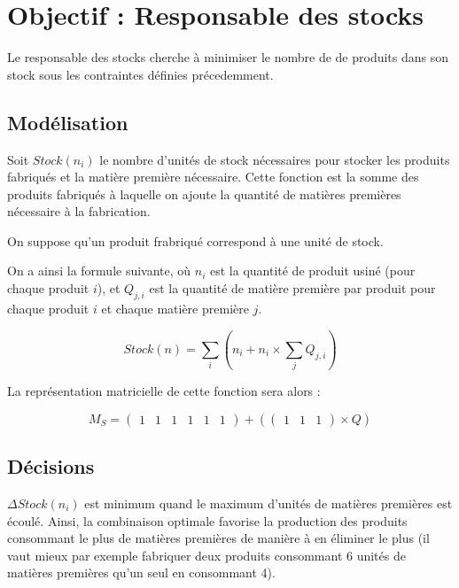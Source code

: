 \newpage
\section{Objectif : Responsable des stocks}
Le responsable des stocks cherche à minimiser le nombre de de produits dans
son stock sous les contraintes définies précedemment.

\subsection{Modélisation}
Soit $Stock(n_{i})$ le nombre d'unités de stock nécessaires pour stocker les
produits fabriqués et la matière première nécessaire. Cette fonction est la
somme des produits fabriqués à laquelle on ajoute la quantité de matières
premières nécessaire à la fabrication.

On suppose qu'un produit frabriqué correspond à une unité de stock.

On a ainsi la formule suivante, où $n_{i}$ est la quantité de produit usiné
(pour chaque produit $i$), et $Q_{j,i}$ est la quantité de matière première
par produit pour chaque produit $i$ et chaque matière première $j$.

\begin{equation}
	Stock(n) = \sum_{i} (n_{i} + n_{i} \times \sum_{j} Q_{j,i})
\end{equation}

La représentation matricielle de cette fonction sera alors :

\begin{equation}
	M_S = \begin{pmatrix}
		1 & 1 & 1 & 1 & 1 & 1
	\end{pmatrix} + (
	\begin{pmatrix}
		1 & 1 & 1
	\end{pmatrix}
	\times Q)
\end{equation}

\subsection{Décisions}
$\Delta Stock(n_{i})$ est minimum quand le maximum d'unités de matières
premières est écoulé. Ainsi, la combinaison optimale favorise la production des
produits consommant le plus de matières premières de manière à en éliminer le
plus (il vaut mieux par exemple fabriquer deux produits consommant 6 unités de
matières premières qu'un seul en consommant 4).